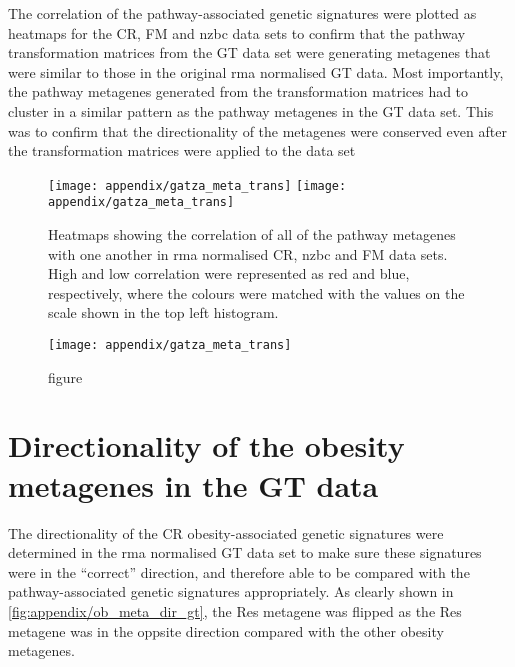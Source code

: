 	The correlation of the pathway-associated genetic signatures were plotted as heatmaps for the CR, FM and \gls{nzbc} data sets to confirm that the pathway transformation matrices from the GT data set were generating metagenes that were similar to those in the original \gls{rma} normalised GT data.
	Most importantly, the pathway metagenes generated from the transformation matrices had to cluster in a similar pattern as the pathway metagenes in the GT data set.
	This was to confirm that the directionality of the metagenes were conserved even after the transformation matrices were applied to the data set

	\begin{figure}[htp!]
		\centering
		\texttt{[image: appendix/gatza\_meta\_trans]}
		\texttt{[image: appendix/gatza\_meta\_trans]}
		\caption[Heatmaps of the Pearson correlation of all the pathway metagenes in the \gls{rma}-normalised CR, \gls{nzbc} and FM data]{Heatmaps showing the correlation of all of the pathway metagenes with one another in \gls{rma} normalised CR, \gls{nzbc} and FM data sets.
		High and low correlation were represented as red and blue, respectively, where the colours were matched with the values on the scale shown in the top left histogram.}
		\label{fig:appendix/gt_pathmeta_other_data}
	\end{figure}

	\begin{figure}[htpb]
		\ContinuedFloat
		\captionsetup{list=off,format=cont}
		\centering
		\texttt{[image: appendix/gatza\_meta\_trans]}
		\caption[]{figure}
	\end{figure}

	\section{Directionality of the obesity metagenes in the GT data}
	\label{sec:directionality_of_the_obesity_metagenes_in_the_gt_data}

	The directionality of the CR obesity-associated genetic signatures were determined in the \gls{rma} normalised GT data set to make sure these signatures were in the ``correct'' direction, and therefore able to be compared with the pathway-associated genetic signatures appropriately.
	As clearly shown in \cref{fig:appendix/ob_meta_dir_gt}, the Res metagene was flipped as the Res metagene was in the oppsite direction compared with the other obesity metagenes.

